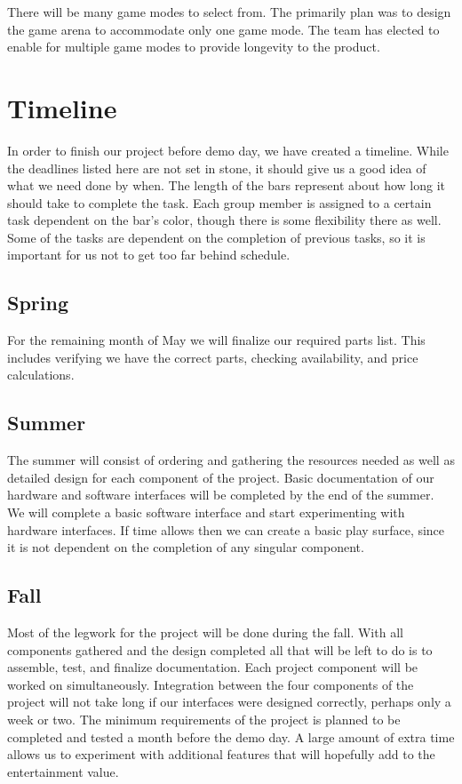 \documentclass[11pt]{ieeeconf}
\begin{document}
There will be many game modes to select from. The primarily plan was to design the game arena to accommodate only one game mode. The team has elected to enable for multiple game modes to provide longevity to the product.    

\section{Timeline}
In order to finish our project before demo day, we have created a timeline. While the deadlines listed here are not set in stone, it should give us a good idea of what we need done by when. The length of the bars represent about how long it should take to complete the task. Each group member is assigned to a certain task dependent on the bar's color, though there is some flexibility there as well. Some of the tasks are dependent on the completion of previous tasks, so it is important for us not to get too far behind schedule. 

\subsection{Spring}
For the remaining month of May we will finalize our required parts list. This includes verifying we have the correct parts, checking availability, and price calculations.

\subsection{Summer}
The summer will consist of ordering and gathering the resources needed as well as detailed design for each component of the project. Basic documentation of our hardware and software interfaces will be completed by the end of the summer. We will complete a basic software interface and start experimenting with hardware interfaces. If time allows then we can create a basic play surface, since it is not dependent on the completion of any singular component.

\subsection{Fall}
Most of the legwork for the project will be done during the fall. With all components gathered and the design completed all that will be left to do is to assemble, test, and finalize documentation. Each project component will be worked on simultaneously. Integration between the four components of the project will not take long if our interfaces were designed correctly, perhaps only a week or two. The minimum requirements of the project is planned to be completed and tested a month before the demo day. A large amount of extra time allows us to experiment with additional features that will hopefully add to the entertainment value.
\end{document}
